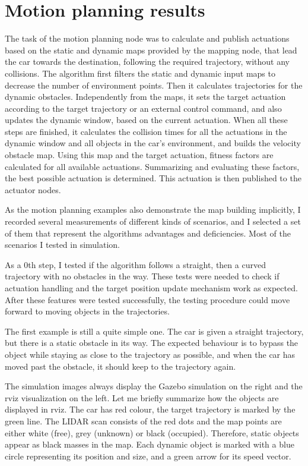 \section{Motion planning results}
The task of the motion planning node was to calculate and publish actuations based on the static and dynamic maps provided by the mapping node, that lead the car towards the destination, following the required trajectory, without any collisions. The algorithm first filters the static and dynamic input maps to decrease the number of environment points. Then it calculates trajectories for the dynamic obstacles. Independently from the maps, it sets the target actuation according to the target trajectory or an external control command, and also updates the dynamic window, based on the current actuation. When all these steps are finished, it calculates the collision times for all the actuations in the dynamic window and all objects in the car's environment, and builds the velocity obstacle map. Using this map and the target actuation, fitness factors are calculated for all available actuations. Summarizing and evaluating these factors, the best possible actuation is determined. This actuation is then published to the actuator nodes.

As the motion planning examples also demonstrate the map building implicitly, I recorded several measurements of different kinds of scenarios, and I selected a set of them that represent the algorithms advantages and deficiencies. Most of the scenarios I tested in simulation.

As a 0th step, I tested if the algorithm follows a straight, then a curved trajectory with no obstacles in the way. These tests were needed to check if actuation handling and the target position update mechanism work as expected. After these features were tested successfully, the testing procedure could move forward to moving objects in the trajectories.

The first example is still a quite simple one. The car is given a straight trajectory, but there is a static obstacle in its way. The expected behaviour is to bypass the object while staying as close to the trajectory as possible, and when the car has moved past the obstacle, it should keep to the trajectory again.

The simulation images always display the Gazebo simulation on the right and the rviz visualization on the left. Let me briefly summarize how the objects are displayed in rviz. The car has red colour, the target trajectory is marked by the green line. The LIDAR scan consists of the red dots and the map points are either white (free), grey (unknown) or black (occupied). Therefore, static objects appear as black masses in the map. Each dynamic object is marked with a blue circle representing its position and size, and a green arrow for its speed vector.

